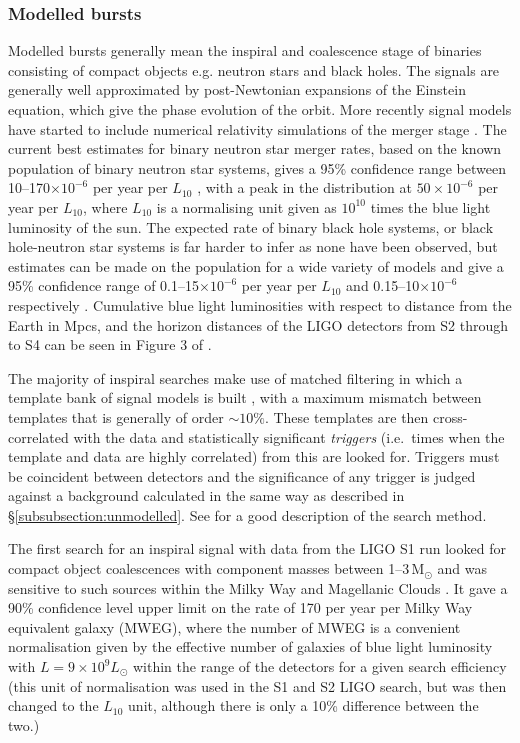 \documentclass{article}
\begin{document}
\subsubsection{Modelled bursts}
Modelled bursts generally mean the inspiral and coalescence stage of binaries
consisting of compact objects e.g. neutron stars and black holes. The signals
are generally well approximated by post-Newtonian expansions of the Einstein
equation, which give the phase evolution of the orbit. More recently signal 
models have started to include numerical relativity simulations of the
merger stage \cite{Aylott:2009}. The current best estimates for binary neutron 
star merger rates, based on the known population of binary neutron star systems, 
gives a 95\% confidence range between 10--170$\times10^{-6}$ per year per $L_{10}$
\cite{Kalogera:2004a, Kalogera:2004b}, with a peak in the distribution at
$50\times10^{-6}$ per year per $L_{10}$, where $L_{10}$ is a normalising unit
given as $10^{10}$ times the blue light luminosity of the sun. The expected rate
of binary black hole systems, or black hole-neutron star systems is far harder
to infer as none have been observed, but estimates can be made on the population
for a wide variety of models and give a 95\% confidence range of
0.1--15$\times10^{-6}$ per year per $L_{10}$ and 0.15--10$\times10^{-6}$
respectively \cite{OShaughnessy:2005, OShaughnessy:2008, Abbott:2008a}.
Cumulative blue light luminosities with respect to distance from the Earth in
Mpcs, and the horizon distances of the LIGO detectors from S2 through to S4
can be seen in Figure 3 of \cite{Abbott:2008a}.

The majority of inspiral searches make use of matched filtering in which a
template bank of signal models is built \cite{Owen:1996, Owen:1999}, with a
maximum mismatch between templates that is generally of order $\sim10\%$. These
templates are then cross-correlated with the data and statistically significant
{\it triggers} (i.e.\ times when the template and data are highly correlated)
from this are looked for. Triggers must be coincident between detectors and the
significance of any trigger is judged against a background calculated in the
same way as described in \S\ref{subsubsection:unmodelled}. See
\cite{Abbott:2005b} for a good description of the search method.

The first search for an inspiral signal with data from the LIGO S1 run looked
for compact object coalescences with component masses between 1--3\,M$_{\odot}$
and was sensitive to such sources within the Milky Way and Magellanic Clouds
\cite{Abbott:2004c}. It gave a 90\% confidence level upper limit on the rate of
170 per year per Milky Way equivalent galaxy (MWEG), where the number of MWEG is
a convenient normalisation given by the effective number of galaxies of blue
light luminosity with $L = 9\times10^9L_{\odot}$ within the range of the
detectors for a given search efficiency (this unit of normalisation was used in
the S1 and S2 LIGO search, but was then changed to the $L_{10}$ unit, although
there is only a 10\% difference between the two.)
\end{document}
